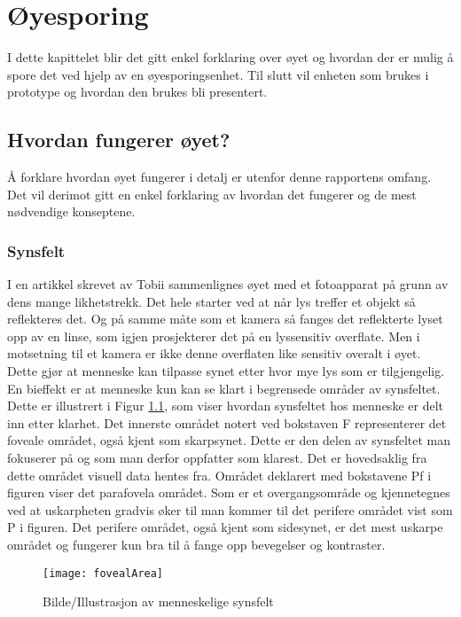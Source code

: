 
\chapter{Øyesporing}

I dette kapittelet blir det gitt enkel forklaring over øyet og hvordan der er mulig å spore det ved hjelp av en øyesporingsenhet. Til slutt vil enheten som brukes i prototype og hvordan den brukes bli presentert.


\section{Hvordan fungerer øyet?}

Å forklare hvordan øyet fungerer i detalj er utenfor denne rapportens omfang. Det vil derimot gitt en enkel forklaring av hvordan det fungerer og de mest nødvendige konseptene.

\subsection{Synsfelt}

I en artikkel skrevet av Tobii \cite{Calibration} sammenlignes øyet med et fotoapparat på grunn av dens mange likhetstrekk. Det hele starter ved at når lys treffer et objekt så reflekteres det. Og på samme måte som et kamera så fanges det reflekterte lyset opp av en linse, som igjen prosjekterer det på en lyssensitiv overflate. Men i motsetning til et kamera er ikke denne overflaten like sensitiv overalt i øyet. Dette gjør at menneske kan tilpasse synet etter hvor mye lys som er tilgjengelig. En bieffekt er at menneske kun kan se klart i begrensede områder av synsfeltet. Dette er illustrert i Figur \ref{fig:visueltArea}, som viser hvordan synsfeltet hos menneske er delt inn etter klarhet. Det innerste området notert ved bokstaven F representerer det foveale området, også kjent som skarpsynet. Dette er den delen av synsfeltet man fokuserer på og som man derfor oppfatter som klarest. Det er hovedsaklig fra dette området visuell data hentes fra. Området deklarert med bokstavene Pf i figuren viser det parafovela området. Som er et overgangsområde og kjennetegnes ved at uskarpheten gradvis øker til man kommer til det perifere området vist som P i figuren. Det perifere området, også kjent som sidesynet, er det mest uskarpe området og fungerer kun bra til å fange opp bevegelser og kontraster.

\begin{figure}[ht!]
\centering
\texttt{[image: fovealArea]}
\caption{Bilde/Illustrasjon av menneskelige synsfelt \cite{VisualImage}}
\label{fig:visueltArea}
\end{figure}

